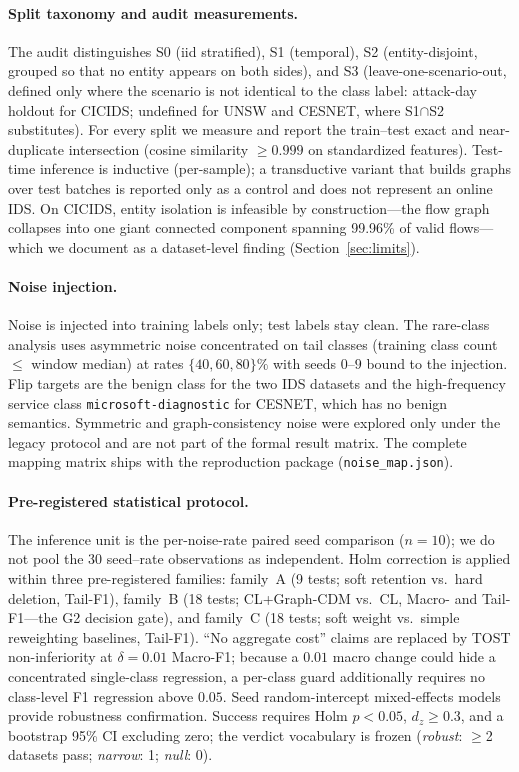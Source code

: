 \documentclass[pdflatex,referee,lineno,sn-basic,Numbered]{sn-jnl}
\begin{document}
\paragraph{Split taxonomy and audit measurements.}
The audit distinguishes S0 (iid stratified), S1 (temporal), S2 (entity-disjoint,
grouped so that no entity appears on both sides), and S3
(leave-one-scenario-out, defined only where the scenario is not identical to the
class label: attack-day holdout for CICIDS; undefined for UNSW and CESNET, where
S1$\cap$S2 substitutes). For every split we measure and report the train--test
exact and near-duplicate intersection (cosine similarity $\ge 0.999$ on
standardized features). Test-time inference is inductive (per-sample); a
transductive variant that builds graphs over test batches is reported only as a
control and does not represent an online IDS. On CICIDS, entity isolation is
infeasible by construction---the flow graph collapses into one giant connected
component spanning 99.96\% of valid flows---which we document as a dataset-level
finding (Section~\ref{sec:limits}).

\paragraph{Noise injection.}
Noise is injected into training labels only; test labels stay clean. The
rare-class analysis uses asymmetric noise concentrated on tail classes (training
class count $\le$ window median) at rates $\{40,60,80\}\%$ with seeds $0$--$9$
bound to the injection. Flip targets are the benign class for the two IDS
datasets and the high-frequency service class \texttt{microsoft-diagnostic} for
CESNET, which has no benign semantics. Symmetric and graph-consistency noise
were explored only under the legacy protocol and are not part of the formal
result matrix. The complete mapping matrix ships with the reproduction
package (\texttt{noise\_map.json}).

\paragraph{Pre-registered statistical protocol.}
The inference unit is the per-noise-rate paired seed comparison ($n{=}10$); we do
not pool the 30 seed--rate observations as independent. Holm correction is
applied within three pre-registered families: family~A (9 tests; soft retention
vs.\ hard deletion, Tail-F1), family~B (18 tests; CL{+}Graph-CDM vs.\ CL,
Macro- and Tail-F1---the G2 decision gate), and family~C (18 tests; soft weight
vs.\ simple reweighting baselines, Tail-F1). ``No aggregate cost'' claims are
replaced by TOST non-inferiority at $\delta{=}0.01$ Macro-F1; because a
$0.01$ macro change could hide a concentrated single-class regression, a
per-class guard additionally requires no class-level F1 regression above
$0.05$. Seed random-intercept mixed-effects models provide robustness
confirmation. Success requires Holm $p<0.05$, $d_z\ge0.3$, and a bootstrap 95\%
CI excluding zero; the verdict vocabulary is frozen
(\emph{robust}: $\ge$2 datasets pass; \emph{narrow}: 1; \emph{null}: 0).
\end{document}
